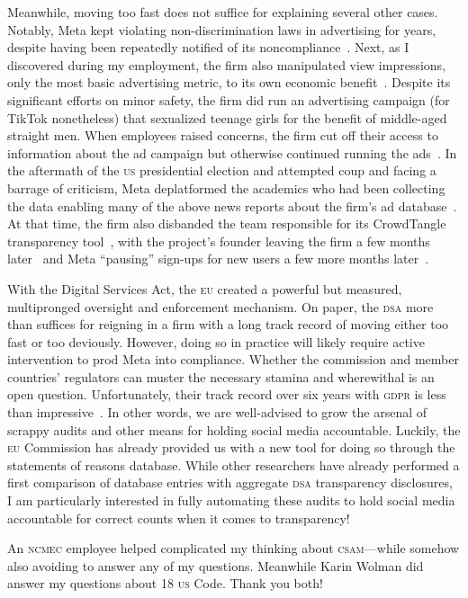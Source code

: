 \documentclass[nonacm,screen]{acmart}
\newcommand\V[1]{\textsc{\MakeLowercase{#1}}}
\begin{document}
Meanwhile, moving too fast does not suffice for explaining several other cases.
Notably, Meta kept violating non-discrimination laws in advertising for years,
despite having been repeatedly notified of its
noncompliance~\cite{AngwinParrisJr2016,AngwinScheiberea2017,AngwinTobinea2017,
KofmanTobin2019,Kofman2022,Merrill2020,TobinMerrill2018}. Next, as I discovered
during my employment, the firm also manipulated view impressions, only the most
basic advertising metric, to its own economic benefit~\cite{Grimm2022c}. Despite
its significant efforts on minor safety, the firm did run an advertising
campaign (for TikTok nonetheless) that sexualized teenage girls for the benefit
of middle-aged straight men. When employees raised concerns, the firm cut off
their access to information about the ad campaign but otherwise continued
running the ads~\cite{SilvermanMac2020}. In the aftermath of the \V{US}
presidential election and attempted coup and facing a barrage of criticism, Meta
deplatformed the academics who had been collecting the data enabling many of the
above news reports about the firm's ad database~\cite{EdelsonMcCoy2021,
EdelsonMcCoy2021a}. At that time, the firm also disbanded the team responsible
for its CrowdTangle transparency tool~\cite{Roose2021a}, with the project's
founder leaving the firm a few months later~\cite{Heath2021} and Meta
``pausing'' sign-ups for new users a few more months
later~\cite{PatelCulliford2022}.

With the Digital Services Act, the \V{EU} created a powerful but measured,
multipronged oversight and enforcement mechanism. On paper, the \V{DSA} more
than suffices for reigning in a firm with a long track record of moving either
too fast or too deviously. However, doing so in practice will likely require
active intervention to prod Meta into compliance. Whether the commission and
member countries' regulators can muster the necessary stamina and wherewithal is
an open question. Unfortunately, their track record over six years with \V{GDPR}
is less than impressive~\cite{Burgess2022}. In other words, we are well-advised
to grow the arsenal of scrappy audits and other means for holding social media
accountable. Luckily, the \V{EU} Commission has already provided us with a new
tool for doing so through the statements of reasons database. While other
researchers have already performed a first comparison of database entries with
aggregate \V{DSA} transparency disclosures, I am particularly interested in
fully automating these audits to hold social media accountable for correct
counts when it comes to transparency!



\begin{acks}
An \V{NCMEC} employee helped complicated my thinking about \V{CSAM}---while
somehow also avoiding to answer any of my questions. Meanwhile Karin Wolman did
answer my questions about 18 \V{US} Code. Thank you both!
\end{acks}



\end{document}
